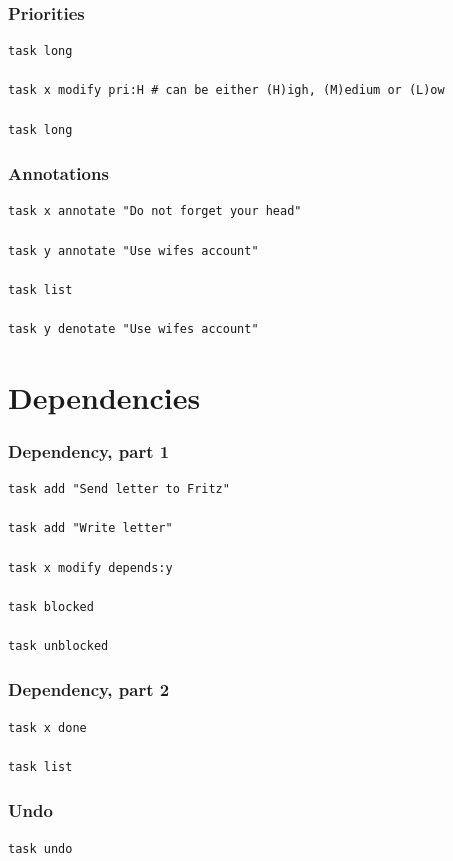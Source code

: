 \documentclass[t,handout]{beamer}
\begin{document}
\begin{frame}[fragile]\frametitle{Priorities}
    \vfill
    \begin{lstlisting}
task long

task x modify pri:H # can be either (H)igh, (M)edium or (L)ow

task long\end{lstlisting}
\end{frame}

\begin{frame}[fragile]\frametitle{Annotations}
    \vfill
    \begin{lstlisting}
task x annotate "Do not forget your head"

task y annotate "Use wifes account"

task list

task y denotate "Use wifes account"\end{lstlisting}
\end{frame}

\section{Dependencies}

\begin{frame}[fragile]\frametitle{Dependency, part 1}
    \vfill
    \begin{lstlisting}
task add "Send letter to Fritz"

task add "Write letter"

task x modify depends:y

task blocked

task unblocked\end{lstlisting}
\end{frame}

\begin{frame}[fragile]\frametitle{Dependency, part 2}
    \vfill
    \begin{lstlisting}
task x done

task list\end{lstlisting}
\end{frame}

\begin{frame}[fragile]\frametitle{Undo}
    \vfill
    \begin{lstlisting}
task undo\end{lstlisting}
\end{frame}
\end{document}
